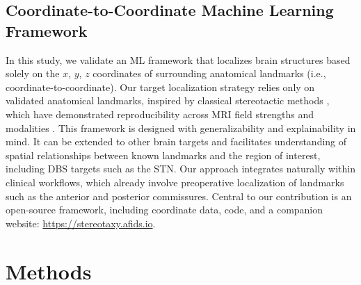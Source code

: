 \subsection{Coordinate-to-Coordinate Machine Learning Framework}
In this study, we validate an ML framework that localizes brain structures based solely on the $x$, $y$, $z$ coordinates of surrounding anatomical landmarks (i.e., coordinate-to-coordinate). Our target localization strategy relies only on validated anatomical landmarks, inspired by classical stereotactic methods \cite{Abbass2022-lf, Lau2019-eh}, which have demonstrated reproducibility across MRI field strengths and modalities \cite{Taha2023-gd}. This framework is designed with generalizability and explainability in mind. It can be extended to other brain targets and facilitates understanding of spatial relationships between known landmarks and the region of interest, including DBS targets such as the STN. Our approach integrates naturally within clinical workflows, which already involve preoperative localization of landmarks such as the anterior and posterior commissures. Central to our contribution is an open-source framework, including coordinate data, code, and a companion website: \url{https://stereotaxy.afids.io}.

\section{Methods}

